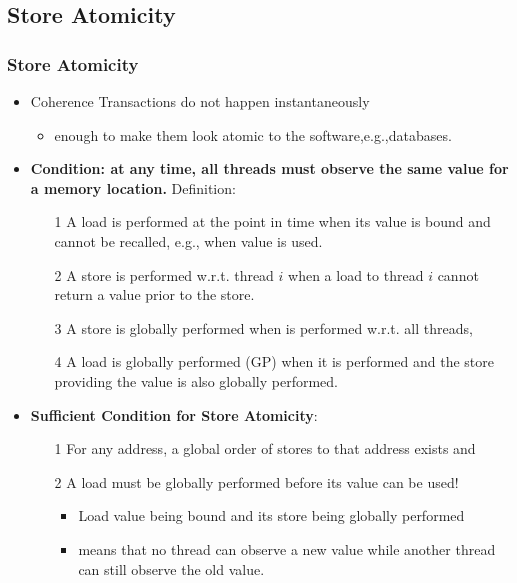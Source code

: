 \documentclass{beamer}
\renewcommand{\emph}[1]{\textcolor{structure}{#1}}
\newcommand{\emp}[1]{\textcolor{DikuRed}{ #1}}
\begin{document}
\subsection{Store Atomicity}

\begin{frame}[fragile,t]
\frametitle{Store Atomicity}

\begin{itemize}
    \item Coherence Transactions do not happen instantaneously
    \begin{itemize}
        \item enough to make them look atomic to the software,e.g.,databases.
    \end{itemize}\medskip

    \item \emp{\bf Condition: at any time, all threads must observe the same value for a memory location.} 
                \emp{Definition:} 
    \begin{itemize}
        \item[1] \emp{A load is performed} at the point in time when 
                    its value is bound and cannot be recalled, e.g., when value is used.
        \item[2] \emp{A store is performed w.r.t. thread $i$} when a load 
                    to thread $i$ cannot return a value prior to the store.
        \item[3] \emp{A store is globally performed} when is performed 
                    w.r.t. all threads,
        \item[4] \emp{A load is globally performed (GP)} when it is performed and 
                    the store providing the value is also globally performed. 
    \end{itemize}\medskip
    \item \emph{{\bf Sufficient Condition for Store Atomicity}:}\pause
    \begin{itemize}
        \item[1] For any address, a global order of stores to that address exists \alert{and}
        \item[2] A load must be globally performed before its value can be used!\medskip
        \begin{itemize}
            \item Load value being bound and its store being globally performed 
            \item means that no thread can observe a new value while another thread
                    can still observe the old value.
        \end{itemize}

    \end{itemize}
\end{itemize}

\end{frame}
\end{document}

